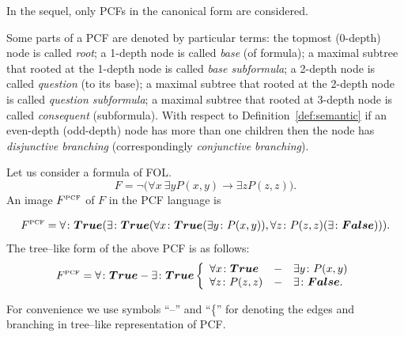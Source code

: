 \documentclass[runningheads,a4paper]{llncs}
\begin{document}
In the sequel, only PCFs in the canonical form are considered.


Some parts of a PCF are denoted by particular terms: the topmost (0-depth) node is called {\em root}; a 1-depth node is called {\em base} (of formula); a maximal subtree that rooted at the 1-depth node is called {\em base subformula}; a 2-depth node is called {\em question} (to its base); a maximal subtree that rooted at the 2-depth node is called {\em question subformula}; a maximal subtree that rooted at 3-depth node is called {\em consequent} (subformula). With respect to Definition~\ref{def:semantic} if an even-depth (odd-depth) node has more than one children then the node has {\em disjunctive branching} (correspondingly {\em conjunctive branching}).%

\begin{example}
Let us consider a formula of FOL.
$$F= \neg\bigl(\forall x\:\exists y P(x,y)\rightarrow \exists z P(z,z)\bigr).$$
An image $F^{\text{\tiny{PCF}}}$ of $F$ in the PCF language is

$$F^{\text{\tiny{PCF}}} = \forall\colon \boldsymbol{True}(\exists\colon\boldsymbol{True}(\forall x\colon\boldsymbol{True}(\exists y\colon P(x,y)), \forall z\colon P(z,z)(\exists\colon\boldsymbol{False}))).$$
The tree--like form of the above PCF is as follows:
$$F^{\text{\tiny{PCF}}} = \forall\colon \boldsymbol{True}-\exists\colon\boldsymbol{True} \left\{
\begin{array}{lcl}
 \forall x\colon\boldsymbol{True} & - & \exists y\colon P(x,y) \\
 \forall z\colon P(z,z) & - & \exists\colon\boldsymbol{False}.
\end{array}
\right.$$
\end{example}
For convenience we use symbols ``--'' and ``\{'' for denoting the edges and branching in tree--like representation of PCF.
\end{document}
